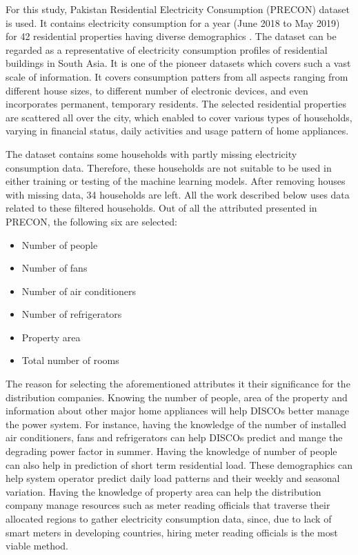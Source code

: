 \documentclass[conference]{IEEEtran}
\begin{document}
For this study, Pakistan Residential Electricity Consumption (PRECON) dataset is used. It contains electricity consumption for a year (June 2018 to May 2019) for 42 residential properties having diverse demographics \cite{9194176}. The dataset can be regarded as a representative of electricity consumption profiles of residential buildings in South Asia. It is one of the pioneer datasets which covers such a vast scale of information. It covers consumption patters from all aspects ranging from different house sizes, to different number of electronic devices, and even incorporates permanent, temporary residents. The selected residential properties are scattered all over the city, which enabled to cover various types of households, varying in financial status, daily activities and usage pattern of home appliances.

The dataset contains some households with partly missing electricity consumption data. Therefore, these households are not suitable to be used in either training or testing of the machine learning models. After removing houses with missing data, 34 households are left. All the work described below uses data related to these filtered households. Out of all the attributed presented in PRECON, the following six are selected:

 \begin{itemize}
     \item Number of people
     \item Number of fans
     \item Number of air conditioners
     \item Number of refrigerators
     \item Property area
     \item Total number of rooms
 \end{itemize}
 
 The reason for selecting the aforementioned attributes it their significance for the distribution companies. Knowing the number of people, area of the property and information about other major home appliances will help DISCOs better manage the power system. For instance, having the knowledge of the number of installed air conditioners, fans and refrigerators can help DISCOs predict and mange the degrading power factor in summer. Having the knowledge of number of people can also help in prediction of short term residential load. These demographics can help system operator predict daily load patterns and their weekly and seasonal variation. Having the knowledge of property area can help the distribution company manage resources such as meter reading officials that traverse their allocated regions to gather electricity consumption data, since, due to lack of smart meters in developing countries, hiring meter reading officials is the most viable method.
\end{document}
